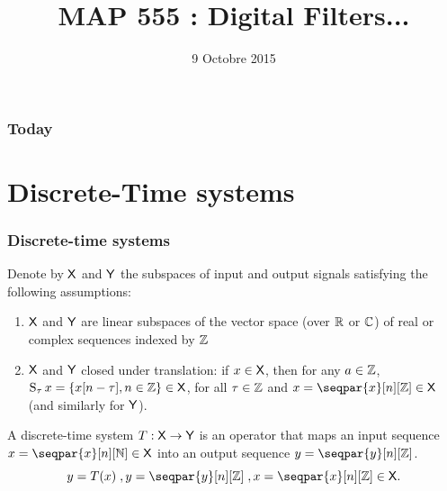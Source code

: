 

\title{MAP 555 : Digital Filters...}

\date{9 Octobre 2015}
\maketitle



\begin{frame}
\frametitle{Today}
\tableofcontents
\end{frame}

\section{Discrete-Time systems}
\begin{frame}
\frametitle{Discrete-time systems}
Denote by $\mathsf{X}$ and $\mathsf{Y}$ the subspaces  of input and output signals satisfying the following assumptions: 
\begin{enumerate}
\item $\mathsf{X}$ and $\mathsf{Y}$ are  linear subspaces of the vector space  (over $\mathbb{R}$ or $\mathbb{C}$) of real or complex sequences indexed by $\mathbb{Z}$
\item $\mathsf{X}$ and $\mathsf{Y}$ closed under translation: if $x \in \mathsf{X}$, then for any $a \in \mathbb{Z}$, $\operatorname{S}_\tau x= \{ x[n-\tau], n \in \mathbb{Z} \} \in \mathsf{X}$, for all $\tau \in \mathbb{Z}$ and $x= \seqpar{x}[n][\zset] \in \Xset$ (and similarly for $\mathsf{Y}$).
\end{enumerate}
\begin{definition}
A discrete-time system $T: \mathsf{X} \to \mathsf{Y}$ is an operator that maps an input sequence $x= \seqpar{x}[n][\nset] \in \Xset$ into an output sequence $y= \seqpar{y}[n][\zset]$.
\alert{$$
y=T(x) \eqsp, y= \seqpar{y}[n][\zset] \eqsp, x= \seqpar{x}[n][\zset] \in \Xset.
$$
}
\end{definition}
\end{frame}

